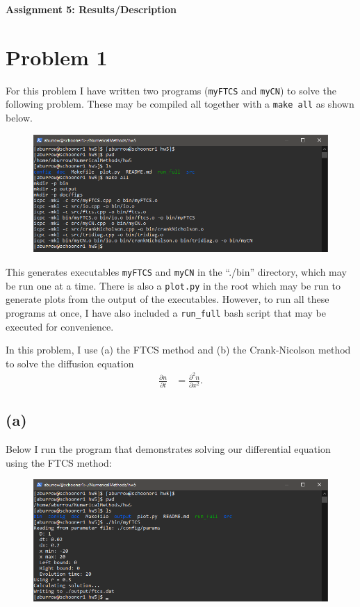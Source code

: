 \documentclass[12pt]{article}
\begin{document}
\begin{center}\begin{LARGE}
\textbf{Assignment 5: Results/Description}
\end{LARGE}\end{center}

\section*{Problem 1}

For this problem I have written two programs (\texttt{myFTCS} and
\texttt{myCN}) to solve the following problem. These may be compiled all
together with a \texttt{make all} as shown below.

\begin{figure}[H]
    \centering
    \includegraphics[width=1\textwidth]{compile}
    \label{fig:compile}
\end{figure}

This generates executables \texttt{myFTCS} and \texttt{myCN} in the ``./bin''
directory, which may be run one at a time. There is also a \texttt{plot.py} in
the root which may be run to generate plots from the output of the executables.
However, to run all these programs at once, I have also included a
\texttt{run\_full} bash script that may be executed for convenience.

In this problem, I use (a) the FTCS method and (b) the Crank-Nicolson method
to solve the diffusion equation
$$
\begin{aligned}
\frac{\partial n}{\partial t}
&= \frac{\partial^2 n}{\partial x^2}.
\end{aligned}
$$

\subsection*{(a)}

Below I run the program that demonstrates solving our differential equation
using the FTCS method:
\begin{figure}[H]
    \centering
    \includegraphics[width=1\textwidth]{myFTCS}
    \label{fig:myFTCS}
\end{figure}
\end{document}
